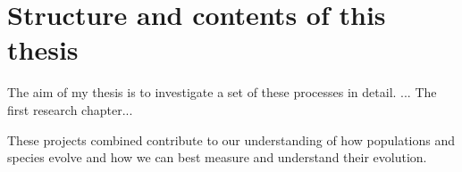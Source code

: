 \section{Structure and contents of this thesis}

The aim of my thesis is to investigate a set of these processes in detail.  ... 
The first research chapter...

These projects combined contribute to our understanding of how populations and species evolve 
and how we can best measure and understand their evolution.

